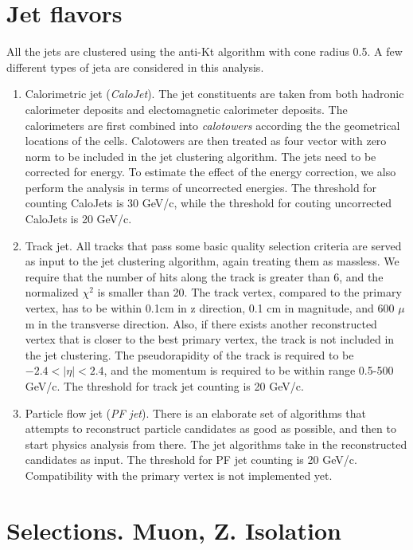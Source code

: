 \documentclass[10pt,a4paper,onecolumn]{article}
\begin{document}
\section{Jet flavors}

All the jets are clustered using the anti-Kt algorithm with cone radius 0.5.  A few different types of jeta are considered in
this analysis.

\begin{enumerate}
\item Calorimetric jet (\emph{CaloJet}).  The jet constituents are taken from both hadronic calorimeter deposits and electomagnetic calorimeter deposits.
   The calorimeters are first combined into \emph{calotowers} according the the geometrical locations of the cells.
   Calotowers are then treated as four vector with zero norm to be included in the jet clustering algorithm.
   The jets need to be corrected for energy.  To estimate the effect of the energy correction, we also perform the analysis in terms of uncorrected energies.
   The threshold for counting CaloJets is 30 GeV/c, while the threshold for couting uncorrected CaloJets is 20 GeV/c.
\item Track jet.  All tracks that pass some basic quality selection criteria are served as input to the jet clustering algorithm, again treating them as massless.
   We require that the number of hits along the track is greater than 6, and the normalized $\chi^2$ is smaller than 20.
   The track vertex, compared to the primary vertex, has to be within 0.1cm in z direction, 0.1 cm in magnitude, and 600 $\mu$m in the transverse direction.
   Also, if there exists another reconstructed vertex that is closer to the best primary vertex, the track is not included in the jet clustering.
   The pseudorapidity of the track is required to be $-2.4 < |\eta| < 2.4$, and the momentum is required to be within range 0.5-500 GeV/c.
   The threshold for track jet counting is 20 GeV/c.
\item Particle flow jet (\emph{PF jet}).  There is an elaborate set of algorithms that attempts to reconstruct particle candidates as good as possible,
   and then to start physics analysis from there.  The jet algorithms take in the reconstructed candidates as input.
   The threshold for PF jet counting is 20 GeV/c.  Compatibility with the primary vertex is not implemented yet.
\end{enumerate}

\section{Selections.  Muon, Z.  Isolation}
\end{document}
